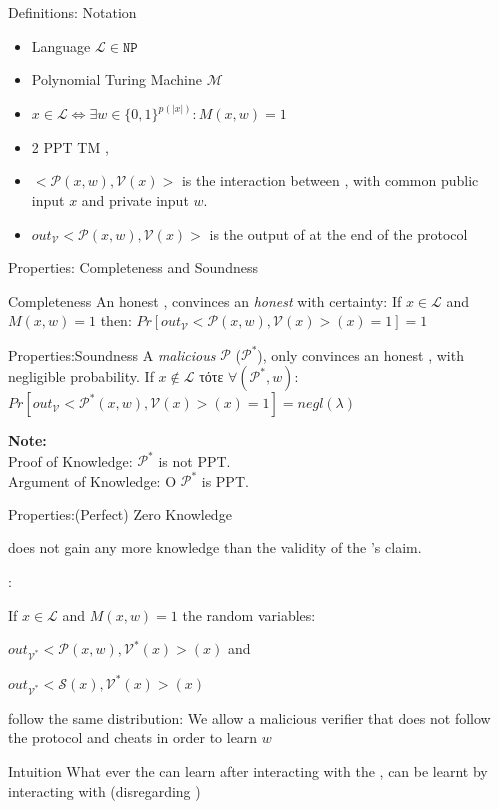 \documentclass[handouts]{beamer}
\begin{document}
\begin{frame}{Definitions: Notation}

\begin{itemize}
\item Language $ \mathcal{L} \in \mathtt{NP}$ \pause
\item Polynomial Turing Machine $\mathcal{M}$ \pause
\item $x \in \mathcal{L} \Leftrightarrow \exists w \in \{0,1\}^{p(|x|)}: M(x,w) = 1$ \pause
\item 2 PPT TM \prv, \ver \pause
\item $<\mathcal{P}(x,w), \mathcal{V}(x)>$ is the interaction between  \prv, \ver with common public input $x$ and private \prv input $w$. \pause
\item $out_\mathcal{V}{<\mathcal{P}(x,w), \mathcal{V}(x)>}$ is the output of \ver at the end of the protocol
\end{itemize}
\end{frame}


\begin{frame}{Properties: Completeness and Soundness}
\begin{block}{Completeness}
An honest \prv, convinces an \emph{honest} \ver with certainty:
If  $x \in \mathcal{L}$ and $M(x,w) = 1$ then:
$ Pr[out_{\mathcal{V}}<\mathcal{P}(x,w), \mathcal{V}(x)>(x)=1] = 1  $
\end{block}
\pause
\begin{block}{Properties:Soundness}
A \emph{malicious} $\mathcal{P}$ ($\mathcal{P}^*$),  only convinces an honest \ver, with negligible probability.
If $x \notin \mathcal{L}$ τότε $\forall (\mathcal{P}^*,w)$: 
$ Pr[out_{\mathcal{V}}<\mathcal{P}^*(x,w), \mathcal{V}(x)>(x)=1] = negl(\lambda) $ 
\end{block}
\pause
\textbf{Note: }\\
Proof of Knowledge: $\mathcal{P}^*$ is \alert{not} PPT. \\
Argument of Knowledge: O $\mathcal{P}^*$  is PPT.
\end{frame}

\begin{frame}{Properties:(Perfect) Zero Knowledge}

\ver does not gain any more knowledge than the validity of the \prv's claim. \pause
 
 : \pause

If  $x \in \mathcal{L}$ and $M(x,w) = 1$ the random variables:

$ out_{\mathcal{V}^*}<\mathcal{P}(x,w), \mathcal{V}^*(x)>(x) $ and  

$ out_{\mathcal{V}^*}<\mathcal{S}(x), \mathcal{V}^*(x)>(x) $ 

follow the same distribution:
\pause
We allow a \alert{malicious verifier} that does not follow the protocol and cheats in order to learn $w$
\pause
\begin{block}{Intuition}
What ever the \ver can learn after interacting with the \prv, can be learnt by interacting with \siml (disregarding \prv)

\end{block}
\end{frame}
\end{document}
